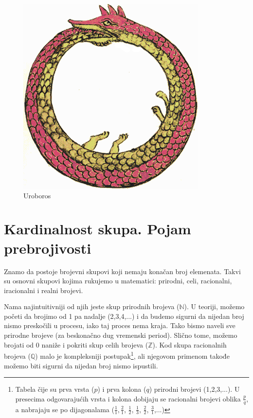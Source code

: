 \documentclass[a4paper]{article}
\begin{document}
\begin{figure}[ht!]
\begin{center}
\includegraphics[scale=0.4]{Uroboros.png}
\end{center}
\caption{Uroboros}
\label{fig:Uroboros}
\end{figure}

\newpage

\section{Kardinalnost skupa. Pojam prebrojivosti}
\label{poglavlje:Kardinalnost. Pojam prebrojivosti}

Znamo da postoje brojevni skupovi koji nemaju konačan broj elemenata. Takvi su osnovni skupovi kojima rukujemo u matematici: prirodni, celi, racionalni, iracionalni i realni brojevi.

Nama najintuitivniji od njih jeste skup prirodnih brojeva ($\mathbb{N}$). U teoriji, možemo početi da brojimo od 1 pa nadalje (2,3,4,...) i da budemo sigurni da nijedan broj nismo preskočili u procesu, iako taj proces nema kraja. Tako bismo naveli sve prirodne brojeve (za beskonačno dug vremenski period). Slično tome, možemo brojati od 0 naniže i pokriti skup celih brojeva ($\mathbb{Z}$). Kod skupa racionalnih brojeva ($\mathbb{Q}$) malo je kompleksniji postupak\footnote{Tabela čije su prva vrsta ($p$) i prva kolona ($q$) prirodni brojevi (1,2,3,...). U presecima odgovarajućih vrsta i kolona dobijaju se racionalni brojevi oblika $\frac{p}{q}$, a nabrajaju se po dijagonalama ($\frac{1}{1}, \frac{2}{1}$, $\frac{1}{2}$, $\frac{1}{3}$, $\frac{2}{2}$, $\frac{3}{1}$,...)
}, ali njegovom primenom takođe možemo biti sigurni da nijedan broj nismo ispustili.
\end{document}
